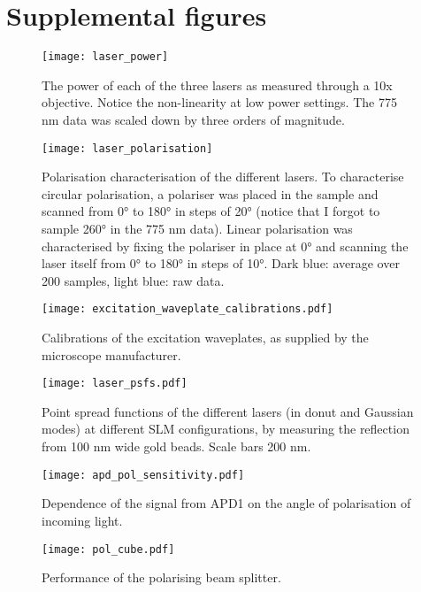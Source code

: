 \chapter{Supplemental figures}


\begin{figure}[ht]
	\centering
	\texttt{[image: laser\_power]}
	\caption{
		The power of each of the three lasers as measured through a 10x objective. Notice the non-linearity at low power settings. The 775 nm data was scaled down by three orders of magnitude.
	}
	\label{fig:laser power}
\end{figure}

\begin{figure}
	\centering
	\texttt{[image: laser\_polarisation]}
	\caption{
		Polarisation characterisation of the different lasers. To characterise circular polarisation, a polariser was placed in the sample and scanned from \ang{0} to \ang{180} in steps of \ang{20} (notice that I forgot to sample \ang{260} in the 775 nm data). Linear polarisation was characterised by fixing the polariser in place at \ang{0} and scanning the laser itself from \ang{0} to \ang{180} in steps of \ang{10}. Dark blue: average over 200 samples, light blue: raw data.
	}
	\label{fig:laser polarisation}
\end{figure}

\begin{figure}
	\centering
	\texttt{[image: excitation\_waveplate\_calibrations.pdf]}
	\caption{
		Calibrations of the excitation waveplates, as supplied by the microscope manufacturer.
	}
	\label{fig:excitation waveplate calibration}
\end{figure}

\begin{figure}
	\centering
	\texttt{[image: laser\_psfs.pdf]}
	\caption{
		Point spread functions of the different lasers (in donut and Gaussian modes) at different SLM configurations, by measuring the reflection from 100 nm wide gold beads. Scale bars 200 nm.
	}
	\label{fig:normal psfs}
\end{figure}

\begin{figure}
	\centering
	\texttt{[image: apd\_pol\_sensitivity.pdf]}
	\caption{Dependence of the signal from APD1 on the angle of polarisation of incoming light.}
	\label{fig:apd pol sensitivity}
\end{figure}

\begin{figure}
	\centering
	\texttt{[image: pol\_cube.pdf]}
	\caption{Performance of the polarising beam splitter.}
	\label{fig:pol cube}
\end{figure}

